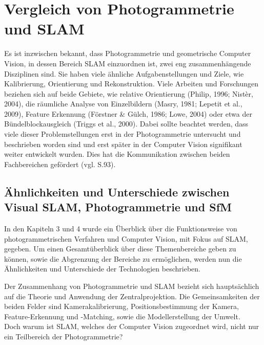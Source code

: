 \chapter{Vergleich von Photogrammetrie und SLAM}

Es ist inzwischen bekannt, dass Photogrammetrie und geometrische Computer Vision, in dessen Bereich SLAM einzuordnen ist, zwei eng zusammenhängende Disziplinen sind. Sie haben viele ähnliche Aufgabenstellungen und Ziele, wie Kalibrierung, Orientierung und Rekonstruktion. Viele Arbeiten und Forschungen beziehen sich auf beide Gebiete, wie relative Orientierung (Philip, 1996; Nistèr, 2004), die räumliche Analyse von Einzelbildern (Masry, 1981; Lepetit et al., 2009), Feature Erkennung  (Förstner \& Gülch, 1986; Lowe, 2004) oder etwa der Bündelblockausgleich  (Triggs et al., 2000). Dabei sollte beachtet werden, dass viele dieser Problemstellungen erst in der Photogrammetrie untersucht und beschrieben worden sind und erst später in der Computer Vision signifikant weiter entwickelt wurden. Dies hat die Kommunikation zwischen beiden Fachbereichen gefördert (vgl. \cite{ph_vs_cv} S.93).


\section{Ähnlichkeiten und Unterschiede zwischen Visual SLAM, Photogrammetrie und SfM}

In den Kapiteln 3 und 4 wurde ein Überblick über die Funktionsweise von photogrammetrischen Verfahren und Computer Vision, mit Fokus auf SLAM, gegeben. Um einen Gesamtüberblick über diese Themenbereiche geben zu können, sowie die Abgrenzung der Bereiche zu ermöglichen, werden nun die Ähnlichkeiten und Unterschiede der Technologien beschrieben. 

Der Zusammenhang von Photogrammetrie und SLAM bezieht sich hauptsächlich auf die Theorie und Anwendung der Zentralprojektion. Die Gemeinsamkeiten der beiden Felder sind Kamerakalibrierung, Positionsbestimmung der Kamera, Feature-Erkennung und -Matching, sowie die  Modellerstellung der Umwelt. \\ Doch warum ist SLAM, welches der Computer Vision zugeordnet wird, nicht nur ein Teilbereich der Photogrammetrie?

